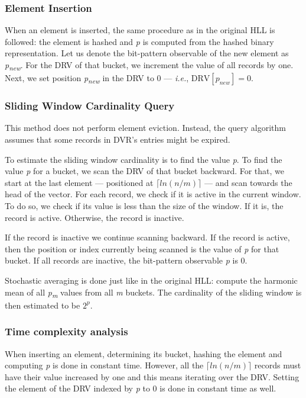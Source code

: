 \subsubsection*{Element Insertion}
When an element is inserted, the same procedure as in the original HLL is followed: the element is hashed and \textit{p} is computed from the hashed binary representation. Let us denote the bit-pattern observable of the new element as \textit{p\textsubscript{new}}. For the DRV of that bucket, we increment the value of all records by one. Next, we set position \textit{p\textsubscript{new}} in the DRV to 0 --- \textit{i.e.}, $\textrm{DRV}[p_{new}] = 0$.


\subsubsection*{Sliding Window Cardinality Query} 
This method does not perform element eviction. Instead, the query algorithm assumes that some records in DVR's entries might be expired. 

To estimate the sliding window cardinality is to find the value \textit{p}. To find the value \textit{p} for a bucket, we scan the DRV of that bucket backward. For that, we start at the last element --- positioned at \textit{$\lceil ln(n/m) \rceil$} --- and scan towards the head of the vector. For each record, we check if it is active in the current window. To do so, we check if its value is less than the size of the window. If it is, the record is active. Otherwise, the record is inactive.

If the record is inactive we continue scanning backward. If the record is active, then the position or index currently being scanned is the value of \textit{p} for that bucket. If all records are inactive, the bit-pattern observable \textit{p} is 0.

Stochastic averaging is done just like in the original HLL: compute the harmonic mean of all \textit{p\textsubscript{m}} values from all \textit{m} buckets. The cardinality of the sliding window is then estimated to be $2^\textit{p}$.

\subsubsection*{Time complexity analysis}
When inserting an element, determining its bucket, hashing the element and computing \textit{p} is done in constant time. However, all the  \textit{$\lceil ln(n/m) \rceil$} records must have their value increased by one and this means iterating over the DRV. Setting the element of the DRV indexed by \textit{p} to 0 is done in constant time as well. 

